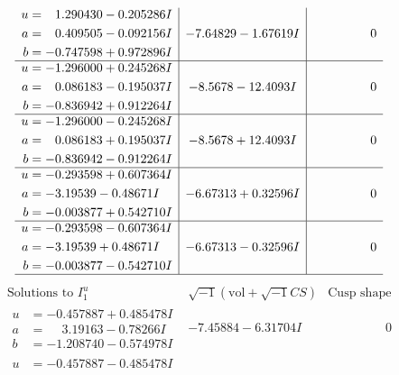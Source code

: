 \documentclass[1p]{elsarticle_modified}
\theoremstyle{definition}
\newcommand{\I}{\sqrt{-1}}
\begin{document}
$$\begin{array}{c|c|c}
\begin{aligned}
u &= \phantom{-}1.290430 - 0.205286 I \\
a &= \phantom{-}0.409505 - 0.092156 I \\
b &= -0.747598 + 0.972896 I\end{aligned}
 & -7.64829 - 1.67619 I & \phantom{-0.000000 } 0 \\ \hline\begin{aligned}
u &= -1.296000 + 0.245268 I \\
a &= \phantom{-}0.086183 - 0.195037 I \\
b &= -0.836942 + 0.912264 I\end{aligned}
 & -8.5678 - 12.4093 I & \phantom{-0.000000 } 0 \\ \hline\begin{aligned}
u &= -1.296000 - 0.245268 I \\
a &= \phantom{-}0.086183 + 0.195037 I \\
b &= -0.836942 - 0.912264 I\end{aligned}
 & -8.5678 + 12.4093 I & \phantom{-0.000000 } 0 \\ \hline\begin{aligned}
u &= -0.293598 + 0.607364 I \\
a &= -3.19539 - 0.48671 I \\
b &= -0.003877 + 0.542710 I\end{aligned}
 & -6.67313 + 0.32596 I & \phantom{-0.000000 } 0 \\ \hline\begin{aligned}
u &= -0.293598 - 0.607364 I \\
a &= -3.19539 + 0.48671 I \\
b &= -0.003877 - 0.542710 I\end{aligned}
 & -6.67313 - 0.32596 I & \phantom{-0.000000 } 0\\
 \hline 
 \end{array}$$\newpage$$\begin{array}{c|c|c}  
\text{Solutions to }I^u_{1}& \I (\text{vol} + \sqrt{-1}CS) & \text{Cusp shape}\\
 \hline 
\begin{aligned}
u &= -0.457887 + 0.485478 I \\
a &= \phantom{-}3.19163 - 0.78266 I \\
b &= -1.208740 - 0.574978 I\end{aligned}
 & -7.45884 - 6.31704 I & \phantom{-0.000000 } 0 \\ \hline\begin{aligned}
u &= -0.457887 - 0.485478 I \\

\end{aligned}
\end{array}$$
\end{document}
